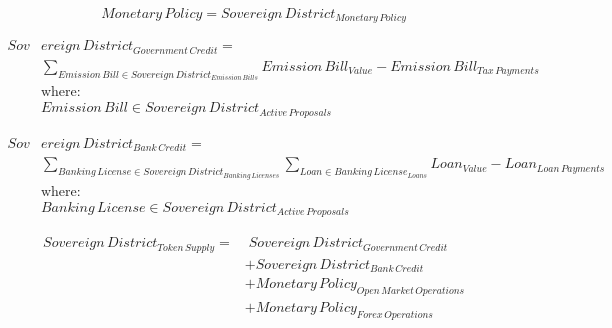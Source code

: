 \documentclass[fleqn]{article}
\begin{document}
	
	\Large

	\begin{equation} 
		Monetary \, Policy = Sovereign \, District_{Monetary \, Policy}
	\end{equation}
	
	\begin{equation}
		\begin{split}
			Sov&ereign \, District_{Government  \, Credit} = \\
			&\displaystyle\sum_{Emission \, Bill \in Sovereign \, District_{Emission \, Bills}} 
				Emission \, Bill_{Value} - Emission \, Bill_{Tax \, Payments} \\
			& \text{where:} \\
			& Emission \, Bill \in Sovereign \, District_{Active \, Proposals}
		\end{split}
	\end{equation}
	
	\begin{equation}
		\begin{split}
			Sov&ereign \, District_{Bank \, Credit} = \\
			&\displaystyle\sum_{Banking \, License \in Sovereign \, District_{Banking \, Licenses}} 
			\displaystyle\sum_{Loan \in Banking \, License_{Loans}} Loan_{Value} - Loan_{Loan \, Payments} \\
			& \text{where:} \\
			& Banking \, License \in Sovereign \, District_{Active \, Proposals}
		\end{split}
	\end{equation}
	
	\begin{equation}
		\begin{split}
		Sovereign \, District_{Token \, Supply} =& \; Sovereign \, District_{Government  \, Credit} \\
		& + Sovereign \, District_{Bank \, Credit} \\
		& + Monetary \, Policy_{Open \, Market \, Operations} \\
		& + Monetary \, Policy_{Forex \, Operations}
		\end{split}
	\end{equation}
\end{document}
